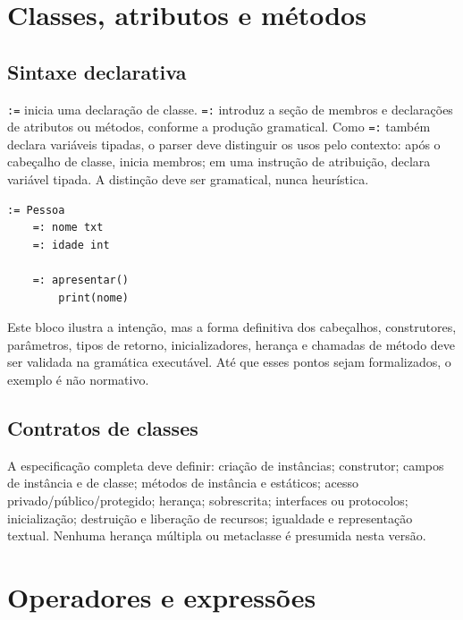 \documentclass[12pt,a4paper]{article}
\begin{document}
\section{Classes, atributos e métodos}
\subsection{Sintaxe declarativa}
\texttt{:=} inicia uma declaração de classe. \texttt{=:} introduz a seção de membros e declarações de atributos ou métodos, conforme a produção gramatical. Como \texttt{=:} também declara variáveis tipadas, o parser deve distinguir os usos pelo contexto: após o cabeçalho de classe, inicia membros; em uma instrução de atribuição, declara variável tipada. A distinção deve ser gramatical, nunca heurística.
\begin{lstlisting}
:= Pessoa
    =: nome txt
    =: idade int

    =: apresentar() 
        print(nome)
\end{lstlisting}
Este bloco ilustra a intenção, mas a forma definitiva dos cabeçalhos, construtores, parâmetros, tipos de retorno, inicializadores, herança e chamadas de método deve ser validada na gramática executável. Até que esses pontos sejam formalizados, o exemplo é não normativo.
\subsection{Contratos de classes}
A especificação completa deve definir: criação de instâncias; construtor; campos de instância e de classe; métodos de instância e estáticos; acesso privado/público/protegido; herança; sobrescrita; interfaces ou protocolos; inicialização; destruição e liberação de recursos; igualdade e representação textual. Nenhuma herança múltipla ou metaclasse é presumida nesta versão.
\section{Operadores e expressões}
\end{document}

